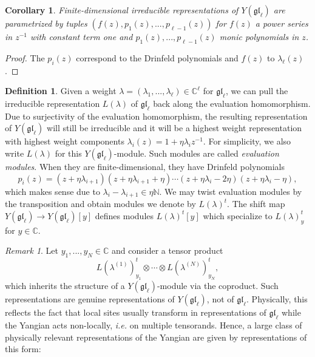 \documentclass[11pt]{report}
\newtheorem{corollary}[theorem]{Corollary}
\theoremstyle{definition}
\newtheorem{definition}[theorem]{Definition}
\theoremstyle{remark}
\newtheorem*{remark}{Remark}
\theoremstyle{remark}
\newcommand{\N}{\mathbb{N}}
\newcommand{\C}{\mathbb{C}}
\begin{document}
\begin{corollary}
Finite-dimensional irreducible representations of $Y(\mathfrak{gl}_\ell)$ are parametrized by tuples $(f(z),p_1(z),...,p_{\ell-1}(z))$ for $f(z)$ a power series in $z^{-1}$ with constant term one and $p_1(z),...,p_{\ell-1}(z)$ monic polynomials in $z$.
\end{corollary}

\begin{proof}
The $p_i(z)$ correspond to the Drinfeld polynomials and $f(z)$ to $\lambda_\ell(z)$.
\end{proof}

\begin{definition}
Given a weight $\lambda = (\lambda_1,...,\lambda_\ell) \in \C^\ell$ for $\mathfrak{gl}_\ell$, we can pull the irreducible representation $L(\lambda)$ of $\mathfrak{gl}_\ell$ back along the evaluation homomorphism. Due to surjectivity of the evaluation homomorphism, the resulting representation of $Y(\mathfrak{gl}_\ell)$ will still be irreducible and it will be a highest weight representation with highest weight components $\lambda_i(z) = 1 + \eta \lambda_i z^{-1}$. For simplicity, we also write $L(\lambda)$ for this $Y(\mathfrak{gl}_\ell)$-module. Such modules are called \emph{evaluation modules}. When they are finite-dimensional, they have Drinfeld polynomials
\begin{equation*}
p_i(z) = (z+\eta \lambda_{i+1})(z+\eta \lambda_{i+1}+\eta) \cdots (z+\eta \lambda_i-2\eta)(z+\eta \lambda_i-\eta),
\end{equation*}
which makes sense due to $\lambda_i - \lambda_{i+1} \in \eta\N$. We may twist evaluation modules by the transposition and obtain modules we denote by $L(\lambda)^t$. The shift map $Y(\mathfrak{gl}_\ell) \to Y(\mathfrak{gl}_\ell)[y]$ defines modules $L(\lambda)^t[y]$ which specialize to $L(\lambda)_y^t$ for $y \in \C$.
\end{definition}

\begin{remark}
Let $y_1,...,y_N \in \C$ and consider a tensor product
\begin{equation*}
L(\lambda^{(1)})_{y_1}^t \otimes \cdots \otimes L(\lambda^{(N)})_{y_N}^t,
\end{equation*}
which inherits the structure of a $Y(\mathfrak{gl}_\ell)$-module via the coproduct. Such representations are genuine representations of $Y(\mathfrak{gl}_\ell)$, not of $\mathfrak{gl}_\ell$. Physically, this reflects the fact that local sites usually transform in representations of $\mathfrak{gl}_\ell$ while the Yangian acts non-locally, \emph{i.e.} on multiple tensorands. Hence, a large class of physically relevant representations of the Yangian are given by representations of this form:
\end{remark}
\end{document}

